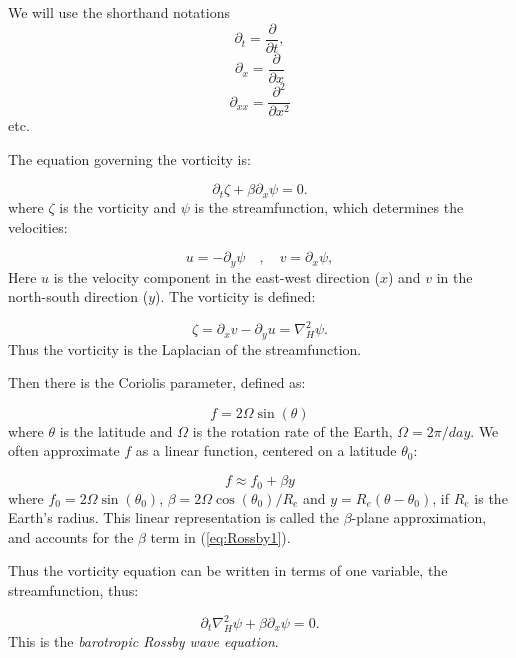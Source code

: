 \documentclass[%
oneside,                 %
final,                   %
10pt]{article}
\begin{document}
We will use the shorthand notations
\[
\partial_t = \frac{\partial }{\partial t},
\]
\[
\partial_x = \frac{\partial }{\partial x}
\]
\[
\partial_{xx} = \frac{\partial^2 }{\partial x^2}
\]
etc. 

The equation governing the vorticity is:

\begin{equation}
  \label{eq:Rossby1}
   \partial_t \zeta  + \beta \partial_x\psi = 0.
 \end{equation}
where $\zeta$ is the vorticity and $\psi$ is the streamfunction, which determines the velocities:

\begin{equation}
	u = -\partial_y \psi \quad,\quad v = \partial_x \psi,
\end{equation}
Here $u$ is the velocity component in the east-west direction ($x$)
and $v$ in the north-south direction ($y$). The vorticity is
defined:

\begin{equation}
\label{eq:Rossby2}
	\zeta = \partial_x v -\partial_y u = \nabla_H^2 \psi.
\end{equation}
Thus the vorticity is the Laplacian of the streamfunction. 

Then there is the Coriolis parameter, defined as:

\begin{equation}
f = 2 \Omega \sin{(\theta)}
\end{equation}
where $\theta$ is the latitude and $\Omega$ is the rotation
rate of the Earth, $\Omega=2 \pi/day$. We often approximate
$f$ as a linear function, centered on a latitude $\theta_0$:

\begin{equation}
f \approx f_0 + \beta y
\end{equation}
where $f_0 = 2 \Omega \sin{(\theta_0)}$, $\beta = 2 \Omega
\cos{(\theta_0)}/R_e$ and $y = R_e (\theta - \theta_0)$, if $R_e$ is the
Earth's radius. This linear representation is called the
$\beta$-plane approximation, and accounts for the $\beta$ term in
(\ref{eq:Rossby1}).

Thus the vorticity equation can be written in terms of one variable,
the streamfunction, thus:

\begin{equation}
  \label{eq:Rossby}
\boxed{\partial_t \nabla_H^2 \psi  + \beta \partial_x\psi = 0.}
 \end{equation}
This is the \emph{barotropic Rossby wave equation}.
\end{document}
